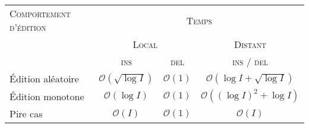 
\small
\begin{tabularx}{1\textwidth}{@{}Xcccc@{}}
  \toprule
  \textsc{Comportement d'édition} & \multicolumn{4}{c}{\textsc{Temps}} \\
    & \multicolumn{2}{c}{\textsc{Local}} & \multicolumn{2}{c}{\textsc{Distant}} \\ \cmidrule(r){2-3} \cmidrule(l){4-5}
  & \textsc{ins} & \textsc{del} & \multicolumn{2}{c}{\textsc{ins} / \textsc{del}}  \\ \midrule
  Édition aléatoire & $\mathcal{O}(\sqrt{\log I})$ & $\mathcal{O}(1)$ & \multicolumn{2}{c}{$\mathcal{O}(\log I + \sqrt{\log I})$} \\
  Édition monotone & $\mathcal{O}(\log I)$ & $\mathcal{O}(1)$ & \multicolumn{2}{c}{$\mathcal{O}((\log I)^2 +\log I)$} \\
  Pire cas & $\mathcal{O}(I)$ & $\mathcal{O}(1)$ & \multicolumn{2}{c}{$\mathcal{O}(I)$} \\ \bottomrule
\end{tabularx}

